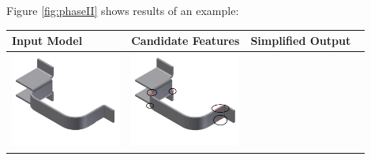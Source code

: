Figure \ref{fig:phaseII} shows results of an example:

\begin{minipage}[t]{0.9\linewidth}
\begin{tabular}[h]{@{} p{0.3\linewidth}| p{0.3\linewidth}|  p{0.3\linewidth}@{}} \toprule

\textbf{Input Model} & \textbf{Candidate Features} & \textbf{Simplified Output} \\ \midrule


\includegraphics[width=0.98\linewidth]{..//Common/images/DefeatBracketPhase_I_3} &
\includegraphics[width=0.98\linewidth]{..//Common/images/DefeatBracketPhase_II_2_circled} &

\end{tabular}
\end{minipage}
